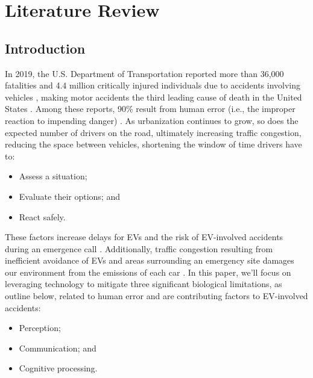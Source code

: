 \chapter{Literature Review}

\section{Introduction}

In 2019, the U.S. Department of Transportation reported more than 36,000 fatalities and 4.4 million critically injured individuals due to accidents involving vehicles \cite{Vehicle-Fatalities2020, Wagner2020}, making motor accidents the third leading cause of death in the United States \cite{Leading-Causes-Death2021}. Among these reports, 90\% result from human error (i.e., the improper reaction to impending danger) \cite{Canada-Driving-Stats2021}. As urbanization continues to grow, so does the expected number of drivers on the road, ultimately increasing traffic congestion, reducing the space between vehicles, shortening the window of time drivers have to:
\begin{itemize} 
	\item Assess a situation;
	
	\item Evaluate their options;  and

	\item React safely.
\end{itemize} 
These factors increase delays for EVs and the risk of EV-involved accidents during an emergence call \cite{Vehicles-on-Road2020}. Additionally, traffic congestion resulting from inefficient avoidance of EVs and areas surrounding an emergency site damages our environment from the emissions of each car \cite{Idling-Impacts2016, Drop2021}.
In this paper, we'll focus on leveraging technology to mitigate three significant biological limitations, as outline below, related to human error and are contributing factors to EV-involved accidents:

\begin{itemize}
	\item Perception;
	
	\item Communication; and
	
	\item Cognitive processing.
\end{itemize}

